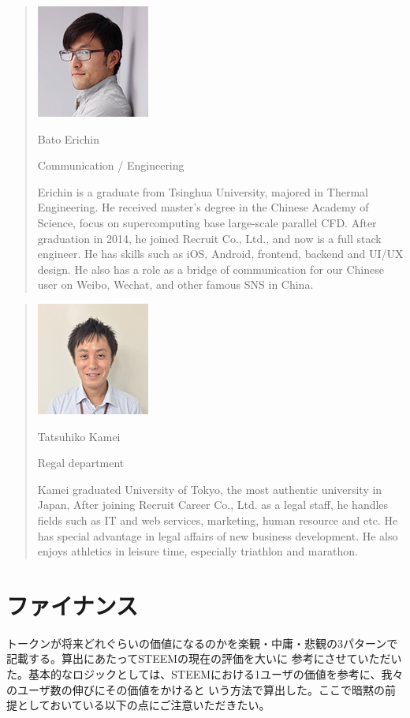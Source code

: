 \documentclass{jsarticle}
\begin{document}
\begin{quote}

	\includegraphics[scale=0.3]{img/erichin.jpg}

Bato Erichin

Communication / Engineering

Erichin is a graduate from Tsinghua University, majored in Thermal Engineering. 
He received master's degree in the Chinese Academy of Science, focus on 
supercomputing base large-scale parallel CFD. After graduation in 2014, he 
joined Recruit Co., Ltd., and now is a full stack engineer. He has skills such as 
iOS, Android, frontend, backend and UI/UX design. He also has a role as a bridge 
of communication for our Chinese user on Weibo, Wechat, and other famous SNS in China.
\end{quote}
\begin{quote}

	\includegraphics[scale=0.3]{img/kamei.jpg}

Tatsuhiko Kamei

Regal department

Kamei graduated University of Tokyo, the most authentic university in Japan, 
After joining Recruit Career Co., Ltd. as a legal staff, he handles fields such as 
IT and web services, marketing, human resource and etc. He has special advantage 
in legal affairs of new business development. He also enjoys athletics in leisure time, 
especially triathlon and marathon.
\end{quote}
\section{ファイナンス}
トークンが将来どれぐらいの価値になるのかを楽観・中庸・悲観の3パターンで記載する。算出にあたってSTEEMの現在の評価を大いに
参考にさせていただいた。基本的なロジックとしては、STEEMにおける1ユーザの価値を参考に、我々のユーザ数の伸びにその価値をかけると
いう方法で算出した。ここで暗黙の前提としておいている以下の点にご注意いただきたい。
\end{document}
